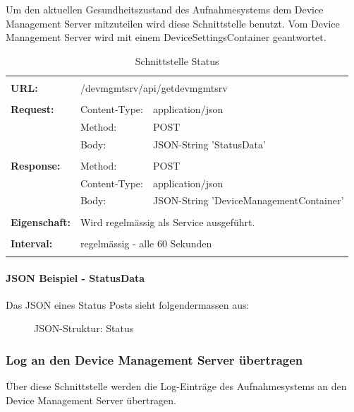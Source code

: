 Um den aktuellen Gesundheitszustand des Aufnahmesystems dem Device Management Server mitzuteilen wird diese Schnittstelle benutzt. Vom Device Management Server wird mit einem DeviceSettingsContainer geantwortet.

{\renewcommand{\arraystretch}{1}
\begin{longtable}{ p{2.5cm} || p{3.5cm} p{5.5cm}}
&  \\ [-1.5ex] 
	\textbf{URL:} & \multicolumn{2}{l}{/devmgmtsrv/api/getdevmgmtsrv}  \\ [1ex] \hline & &  \\ [-1.5ex]
	\textbf{Request:} & Content-Type: & application/json \\
		& Method: & POST \\
		& Body: & JSON-String 'StatusData'  \\ [1ex] \hline & &  \\ [-1.5ex]
	\textbf{Response:} & Method: & POST \\
		& Content-Type: & application/json \\
		& Body: & JSON-String 'DeviceManagementContainer'  \\ [1ex] \hline & &  \\ [-1.5ex]
	\textbf{Eigenschaft:} & \multicolumn{2}{p{9cm}}{Wird regelmässig als Service ausgeführt.}  \\ [1ex] \hline & &  \\ [-1.5ex]
	\textbf{Interval:} & \multicolumn{2}{p{9cm}}{regelmässig - alle 60 Sekunden}  \\ [1ex] 
	
\caption{Schnittstelle Status}
\end{longtable}	}
\paragraph{JSON Beispiel - StatusData}

Das JSON eines Status Posts sieht folgendermassen aus:

\begin{figure}[H]
	\centering
	
	\caption{JSON-Struktur: Status}
\end{figure}


\newpage
\subsubsection{Log an den Device Management Server übertragen}

Über diese Schnittstelle werden die Log-Einträge des Aufnahmesystems an den Device Management Server übertragen.

